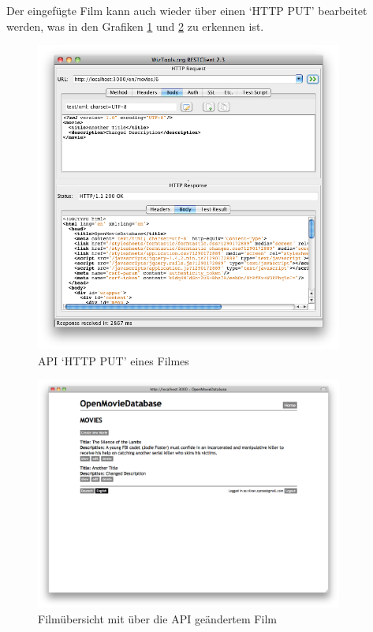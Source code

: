 \clearpage

Der eingefügte Film kann auch wieder über einen `HTTP PUT' bearbeitet werden,
was in den Grafiken \ref{test_schnittstelle_05} und \ref{test_schnittstelle_06}
zu erkennen ist.

\begin{figure}[ht]
    \begin{center}
        \includegraphics[width=0.9\textwidth,angle=0]{./bilder/tests/test_schnittstelle_05.png}
        \caption{API `HTTP PUT' eines Filmes}
        \label{test_schnittstelle_05}
    \end{center}
\end{figure}

\begin{figure}[ht]
    \begin{center}
        \includegraphics[width=0.9\textwidth,angle=0]{./bilder/tests/test_schnittstelle_06.png}
        \caption{Filmübersicht mit über die API geändertem Film}
        \label{test_schnittstelle_06}
    \end{center}
\end{figure}

